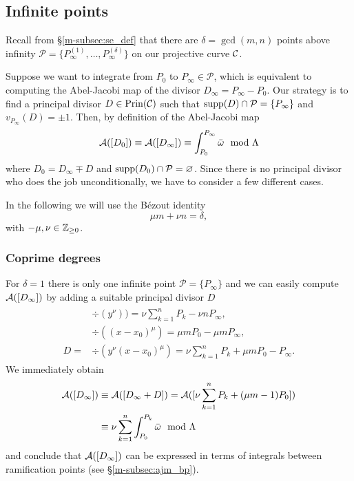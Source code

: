 \documentclass[main.tex]{subfiles}
\begin{document}
  
  
  \subsection{Infinite points}\label{subsec:ajm_infty}

  Recall from \S \ref{m-subsec:se_def} that there are $\delta = \gcd(m,n)$ points above infinity $\mathcal{P}
  = \{ P_{\infty}^{(1)},\dots, P_{\infty}^{(\delta)} \}$ on our projective curve $\mathcal{C}$.
  
  Suppose we want to integrate from $P_0$ to $P_{\infty} \in \mathcal{P}$, which is equivalent to computing the Abel-Jacobi map of the divisor
  $D_{\infty} = P_{\infty} - P_0$.
  Our strategy is to find a principal divisor $D \in \operatorname{Prin}(\mathcal{C})$ such that $\operatorname{supp}(D) \cap \mathcal{P} = \{ P_{\infty} \}$
  and $v_{P_{\infty}}(D) = \pm 1$. Then, by definition of the Abel-Jacobi map
  \begin{equation}
  \mathcal{A}([D_0]) \equiv \mathcal{A}([D_{\infty}]) \equiv \int_{P_0}^{P_{\infty}} \bar{\omega} \mod \Lambda
  \end{equation}
  where $D_0 = D_{\infty} \mp D$ and $\operatorname{supp}(D_0) \cap \mathcal{P} = \varnothing$.
  Since there is no principal divisor who does the job unconditionally, we have to consider a few different cases.
  
  In the following we will use the Bézout identity
  \begin{equation}
    \mu m + \nu n = \delta,
  \end{equation}
  with $-\mu,\nu \in \mathbb{Z}_{\ge 0}$.
  
  
  \subsubsection{Coprime degrees}
  
  For $\delta = 1$ there is only one infinite point $\mathcal{P} = \{ P_{\infty} \}$ and
  we can easily compute  $\mathcal{A}( [D_{\infty}] )$ by adding a suitable
  principal divisor $D$
    \begin{align}
     \begin{split}
      &\div(y^{\nu}) ) =  \nu \sum_{k = 1}^n P_k - \nu n P_{\infty},\\
      &\div((x-x_0)^{\mu})  =  \mu m P_0 - \mu m P_{\infty} ,\\
      D  =  & \div(y^{\nu}(x-x_0)^{\mu})  = \nu \sum_{k = 1}^n P_k + \mu m P_0 - P_{\infty}.
     \end{split}
    \end{align}
    We immediately obtain
    \begin{align}
     \mathcal{A}( [D_{\infty}] )  & \equiv  \mathcal{A}([D_{\infty} + D])  =  \mathcal{A}( [ \nu \sum_{k = 1}^n P_k + (\mu m - 1) P_0 ]  ) \\ & 
      \equiv   \nu \sum_{k=1}^n \int_{P_0}^{P_k} \bar{\omega} \mod \Lambda
    \end{align}
    and conclude that $\mathcal{A}( [D_{\infty}] )$ can be expressed in terms of integrals between
    ramification points (see \S \ref{m-subsec:ajm_bp}).
   
\end{document}
